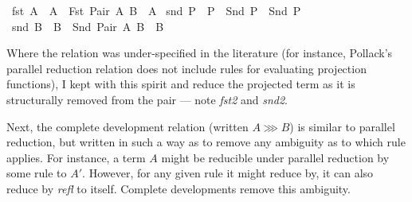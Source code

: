 \begin{implementation}
{\isacharbar}\ fst{}{\isacharcolon}\ {\isachardoublequoteopen}A\ {\isachargreater}{\isachargreater}\ A{\isacharprime}\ {\isasymLongrightarrow}\ {\isacharparenleft}Fst\ {\isacharparenleft}Pair\ A\ B{\isacharparenright}{\isacharparenright}\ {\isachargreater}{\isachargreater}\ A{\isacharprime}{\isachardoublequoteclose}\isanewline
{\isacharbar}\ snd{}{\isacharcolon}\ {\isachardoublequoteopen}P\ {\isachargreater}{\isachargreater}\ P{\isacharprime}\ {\isasymLongrightarrow}\ {\isacharparenleft}Snd\ P{\isacharparenright}\ {\isachargreater}{\isachargreater}\ {\isacharparenleft}Snd\ P{\isacharprime}{\isacharparenright}{\isachardoublequoteclose}\isanewline
{\isacharbar}\ snd{}{\isacharcolon}\ {\isachardoublequoteopen}B\ {\isachargreater}{\isachargreater}\ B{\isacharprime}\ {\isasymLongrightarrow}\ {\isacharparenleft}Snd\ {\isacharparenleft}Pair\ A\ B{\isacharparenright}{\isacharparenright}\ {\isachargreater}{\isachargreater}\ B{\isacharprime}{\isachardoublequoteclose}\isanewline
\end{implementation}

Where the relation was under-specified in the literature (for instance, Pollack's parallel reduction relation does not include rules for evaluating projection functions), I kept with this spirit and reduce the projected term as it is structurally removed from the pair --- note \emph{fst2} and \emph{snd2}.

Next, the complete development relation (written \(A \ggg B\)) is similar to parallel reduction, but written in such a way as to remove any ambiguity as to which rule applies.
For instance, a term \(A\) might be reducible under parallel reduction by some rule to \(A'\).
However, for any given rule it might reduce by, it can also reduce by \emph{refl} to itself.
Complete developments remove this ambiguity.

